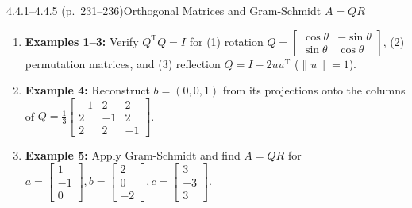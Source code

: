 \documentclass[11pt,a4paper,openany,oneside]{book}
\def\vect#1{#1}%
\def\mathbf#1{#1}%
\newcommand{\vect}[1]{\mathbf{#1}}
\newcommand{\T}{\mathrm{T}}
\numberwithin{equation}{chapter}
\begin{document}
\begin{example}{4.4.1--4.4.5 (p.\ 231--236)}{Orthogonal Matrices and Gram-Schmidt $A = QR$}
\begin{enumerate}
\item \textbf{Examples 1--3:} Verify $Q^\T Q = I$ for (1) rotation $Q = \begin{bmatrix}\cos\theta & -\sin\theta\\\sin\theta & \cos\theta\end{bmatrix}$, (2) permutation matrices, and (3) reflection $Q = I - 2\vect{u}\vect{u}^\T$ ($\|\vect{u}\|=1$).
\item \textbf{Example 4:} Reconstruct $\vect{b} = (0,0,1)$ from its projections onto the columns of $Q = \frac{1}{3}\begin{bmatrix}-1&2&2\\2&-1&2\\2&2&-1\end{bmatrix}$.
\item \textbf{Example 5:} Apply Gram-Schmidt and find $A = QR$ for $\vect{a}=\begin{bmatrix}1\\-1\\0\end{bmatrix}, \vect{b}=\begin{bmatrix}2\\0\\-2\end{bmatrix}, \vect{c}=\begin{bmatrix}3\\-3\\3\end{bmatrix}$.
\end{enumerate}
\end{example}
\end{document}
